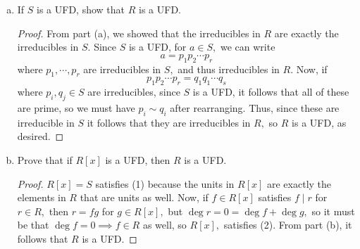 \documentclass{article}
\begin{document}
\begin{itemize}
\begin{enumerate}[(a)]
\begin{proof}
					For the reverse direction, we prove the contrapositive. Suppose $p=ab$ is a nontrivial factorization in $S.$ By (2), since $p\in R$ and $a\mid p$ and $b\mid p,$ it follows that $a, b\in R,$ so $p$ has a nontrivial factorization in $R.$
				\end{proof}

			\item If $S$ is a UFD, show that $R$ is a UFD.
				\begin{proof}
					From part (a), we showed that the irreducibles in $R$ are exactly the irreducibles in $S.$ Since $S$ is a UFD, for $a\in S,$ we can write
					\[a=p_1p_2\cdots p_r\]
					where $p_1, \cdots, p_r$ are irreducibles in $S,$ and thus irreducibles in $R.$ Now, if
					\[p_1p_2\cdots p_r = q_1q_1\cdots q_s\]
					where $p_i, q_j\in S$ are irreducibles, since $S$ is a UFD, it follows that all of these are prime, so we must have $p_i\sim q_i$ after rearranging. Thus, since these are irreducible in $S$ it follows that they are irreducibles in $R,$ so $R$ is a UFD, as desired.
				\end{proof}

			\item Prove that if $R[x]$ is a UFD, then $R$ is a UFD.
				\begin{proof}
					$R[x]=S$ satisfies (1) because the units in $R[x]$ are exactly the elements in $R$ that are units as well. Now, if $f\in R[x]$ satisfies $f\mid r$ for $r\in R,$ then $r=fg$ for $g\in R[x],$ but $\deg r=0=\deg f+\deg g,$ so it must be that $\deg f = 0\implies f\in R$ as well, so $R[x],$ satisfies (2). From part (b), it follows that $R$ is a UFD.
				\end{proof}
				
		\end{enumerate}
		
\end{itemize}
\end{document}
